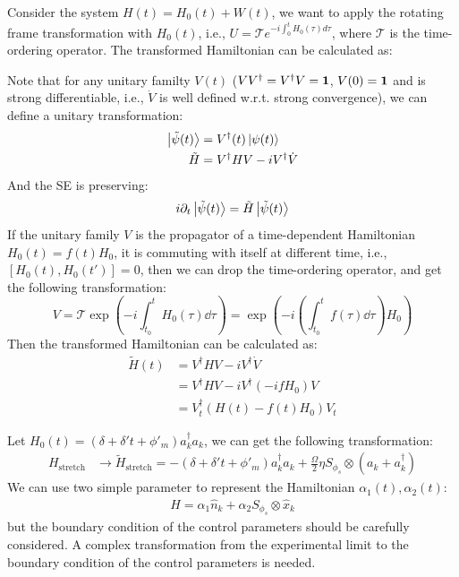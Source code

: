 \documentclass{notes2}
\begin{document}
\begin{notebox}[title=Rotating Frame Transformation]
    Consider the system $H(t) = H_0(t) + W(t)$, we want to apply the rotating frame transformation with $H_0(t)$, i.e., $U = \mathcal{T} e^{-i \int_0^t H_0(\tau) d\tau}$, where $\mathcal{T}$ is the time-ordering operator. The transformed Hamiltonian can be calculated as:

Note that for any unitary familty $V(t)$ ($VV^\dagger = V^\dagger V = \vb 1$,  $V(0) = \vb 1$ and is strong differentiable, i.e., $\dot V$ is well defined w.r.t. strong convergence), we can define a unitary transformation:
\begin{align*}
    \ket{\tilde\psi(t)} &= V^\dagger(t)\ket{\psi(t)}\\
    \tilde H &= V^\dagger H V - i V^\dagger \dot V 
\end{align*}
And the SE is preserving:
\begin{align*}
    i\partial_t \ket{\tilde\psi(t)} = \tilde H \ket{\tilde\psi(t)}
\end{align*}
If the unitary family $V$ is the propagator of a time-dependent Hamiltonian $H_0(t) = f(t)H_0$, it is commuting with itself at different time, i.e., $[H_0(t), H_0(t')] = 0$, then we can drop the time-ordering operator, and get the following transformation:
\begin{equation}
    V = \mathcal{T}\exp(-i \int_{t_0}^{t}H_0(\tau)\dd \tau) = \exp(-i(\int_{t_0}^{t}f(\tau)\dd \tau)H_0)
\end{equation}
Then the transformed Hamiltonian can be calculated as:
\begin{align*}
    \tilde H(t) &= V^\dagger H V - i V^\dagger \dot V \\
    &= V^\dagger H V - i V^\dagger (-ifH_0)V\\
    &= V_t^\dagger (H(t) - f(t)H_0) V_t
\end{align*}
\end{notebox}

Let $H_0(t) = (\delta + \delta't + \phi'_m)  a_k^\dagger a_k$, we can get the following transformation:
\begin{align*}
    H_{\text{stretch}} & \to \tilde H_{\text{stretch}} = - (\delta + \delta't + \phi'_m)a_k^\dagger a_k + \frac{\Omega}{2} \eta S_{\phi_s} \otimes (a_k + a_k^\dagger)
\end{align*}
We can use two simple parameter to represent the Hamiltonian $\alpha_1(t),\alpha_2(t)$:
\begin{align*}
    H = \alpha_1 \hat n_k + \alpha_2 S_{\phi_s} \otimes \hat x_k
\end{align*}
but the boundary condition of the control parameters should be carefully considered. A complex transformation from the experimental limit to the boundary condition of the control parameters is needed.
\end{document}
